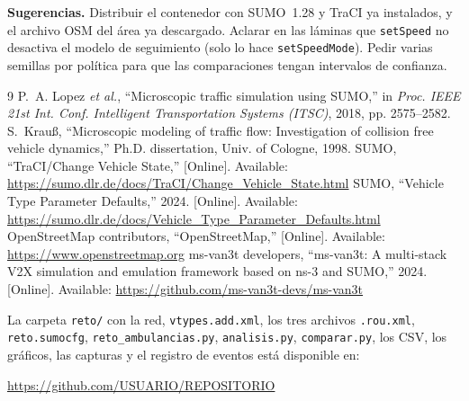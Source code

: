 \documentclass[conference,a4paper]{IEEEtran}
\begin{document}
\textbf{Sugerencias.} Distribuir el contenedor con SUMO~1.28 y TraCI ya instalados, y el
archivo OSM del área ya descargado. Aclarar en las láminas que \texttt{setSpeed} no
desactiva el modelo de seguimiento (solo lo hace \texttt{setSpeedMode}). Pedir varias
semillas por política para que las comparaciones tengan intervalos de confianza.

\begin{thebibliography}{9}
 P.~A. Lopez \emph{et al.}, ``Microscopic traffic simulation using SUMO,''
in \emph{Proc. IEEE 21st Int. Conf. Intelligent Transportation Systems (ITSC)}, 2018,
pp. 2575--2582.
 S.~Krauß, ``Microscopic modeling of traffic flow: Investigation of
collision free vehicle dynamics,'' Ph.D. dissertation, Univ. of Cologne, 1998.
 SUMO, ``TraCI/Change Vehicle State,'' [Online]. Available:
\url{https://sumo.dlr.de/docs/TraCI/Change_Vehicle_State.html}
 SUMO, ``Vehicle Type Parameter Defaults,'' 2024. [Online]. Available:
\url{https://sumo.dlr.de/docs/Vehicle_Type_Parameter_Defaults.html}
 OpenStreetMap contributors, ``OpenStreetMap,'' [Online]. Available:
\url{https://www.openstreetmap.org}
 ms-van3t developers, ``ms-van3t: A multi-stack V2X simulation and
emulation framework based on ns-3 and SUMO,'' 2024. [Online]. Available:
\url{https://github.com/ms-van3t-devs/ms-van3t}
\end{thebibliography}

La carpeta \texttt{reto/} con la red, \texttt{vtypes.add.xml}, los tres archivos
\texttt{.rou.xml}, \texttt{reto.sumocfg}, \texttt{reto\_ambulancias.py},
\texttt{analisis.py}, \texttt{comparar.py}, los CSV, los gráficos, las capturas y el
registro de eventos está disponible en:

\begin{center}
\url{https://github.com/USUARIO/REPOSITORIO}
\end{center}
\end{document}
